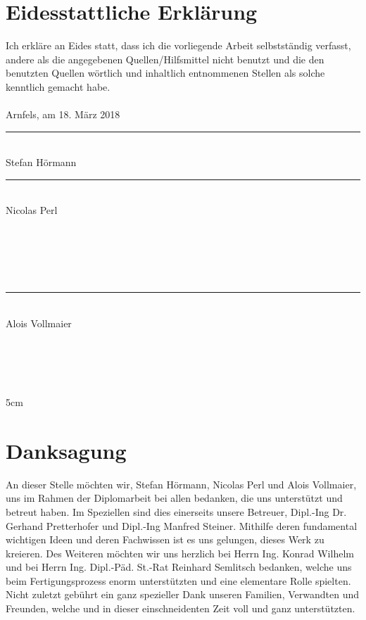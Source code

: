 \frontmatter												%
\addtocounter{page}{2}

\newcommand{\doublesignature}[2]{%
  \parbox{\textwidth}{
    \hfill
    \parbox{7cm}{
      \centering
      \rule{6cm}{1pt}\\
      #1
    }
    \parbox{7cm}{
      \centering
      \rule{6cm}{1pt}\\
      #2
    }
  }
  \mbox{}\\
  \mbox{}\\
  \mbox{}\\
  \mbox{}\\
}
\newcommand{\singlesignature}[2]{%
  \parbox{\textwidth}{
    \hfill
    \parbox{7cm}{
      \centering
      \rule{6cm}{1pt}\\
      #1
    }
  }
  \mbox{}\\
  \mbox{}\\
  \mbox{}\\
  \mbox{}\\
}

\vspace*{20pt}

\section*{Eidesstattliche Erklärung}
\label{sec:eidesstattliche-erklaerung}
Ich erkläre an Eides statt, dass ich die vorliegende Arbeit selbstständig verfasst, andere als die angegebenen
Quellen/Hilfsmittel nicht benutzt und die den benutzten Quellen wörtlich und inhaltlich entnommenen
Stellen als solche kenntlich gemacht habe.\\
\\
Arnfels, am 18. März 2018\\

\vskip 1cm

\doublesignature{Stefan Hörmann}{Nicolas Perl}
\singlesignature{Alois Vollmaier}

\vskip 5cm

\clearpage

\newpage
\thispagestyle{empty}
\mbox{}

\clearpage

\section*{Danksagung}
\label{sec:danksagung}
An dieser Stelle möchten wir, Stefan Hörmann, Nicolas Perl und Alois Vollmaier, uns im Rahmen der Diplomarbeit bei allen bedanken, die uns unterstützt und betreut haben.
Im Speziellen sind dies einerseits unsere Betreuer, Dipl.-Ing Dr. Gerhand Pretterhofer und Dipl.-Ing Manfred Steiner.
Mithilfe deren fundamental wichtigen Ideen und deren Fachwissen ist es uns gelungen, dieses Werk zu kreieren.
Des Weiteren möchten wir uns herzlich bei Herrn Ing. Konrad Wilhelm und bei Herrn Ing. Dipl.-Päd. St.-Rat Reinhard Semlitsch bedanken, welche uns beim Fertigungsprozess enorm unterstützten und eine elementare Rolle spielten.
Nicht zuletzt gebührt ein ganz spezieller Dank unseren Familien, Verwandten und Freunden, welche und in dieser einschneidenten Zeit voll und ganz unterstützten.
\clearpage

